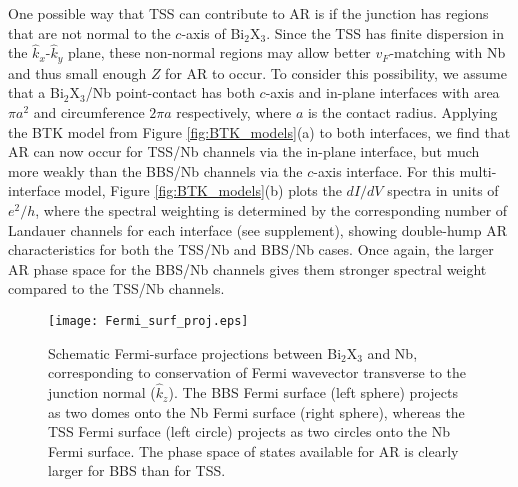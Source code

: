 \documentclass[aps,prl,twocolumn,showpacs,amsmath,amssymb,superscriptaddress,citeautoscript]{revtex4-1}
\begin{document}
One possible way that TSS can contribute to AR is if the junction has regions that are not normal to the $c$-axis of Bi$_{2}$X$_{3}$.  Since the TSS has finite dispersion in the $\hat{k}_x$-$\hat{k}_y$ plane, these non-normal regions may allow better $v_F$-matching with Nb and thus small enough $Z$ for AR to occur.  To consider this possibility, we assume that a Bi$_{2}$X$_{3}$/Nb point-contact has both $c$-axis and in-plane interfaces with area $\pi a^2$ and circumference $2 \pi a $ respectively, where $a$ is the contact radius.  Applying the BTK model from Figure \ref{fig:BTK_models}(a) to both interfaces, we find that AR can now occur for TSS/Nb channels via the in-plane interface, but much more weakly than the BBS/Nb channels via the $c$-axis interface. For this multi-interface model, Figure \ref{fig:BTK_models}(b) plots the $dI/dV$ spectra in units of $e^2/ h$, where the spectral weighting is determined by the corresponding number of Landauer channels for each interface (see supplement), showing double-hump AR characteristics for both the TSS/Nb and BBS/Nb cases.  Once again, the larger AR phase space for the BBS/Nb channels gives them stronger spectral weight compared to the TSS/Nb channels. 

\begin{figure}
\texttt{[image: Fermi\_surf\_proj.eps]}
\caption{\label{fig:fermi_surf_proj} Schematic Fermi-surface projections between Bi$_{2}$X$_{3}$ and Nb, corresponding to conservation of Fermi wavevector transverse to the junction normal ($\hat{k}_z$).  The BBS Fermi surface (left sphere) projects as two domes onto the Nb Fermi surface (right sphere), whereas the TSS Fermi surface (left circle) projects as two circles onto the Nb Fermi surface. The phase space of states available for AR is clearly larger for BBS than for TSS.}
\end{figure}
\end{document}
